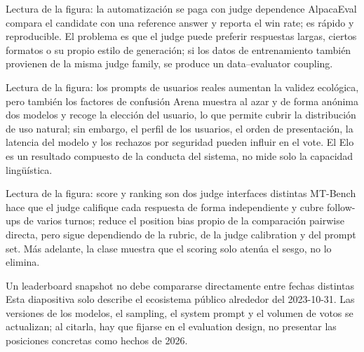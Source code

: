 
\begin{knowledgebox}{Lectura de la figura: la automatización se paga con judge dependence}
AlpacaEval compara el candidate con una reference answer y reporta el win rate; es rápido y reproducible. El problema es que el judge puede preferir respuestas largas, ciertos formatos o su propio estilo de generación; si los datos de entrenamiento también provienen de la misma judge family, se produce un data--evaluator coupling.
\end{knowledgebox}


\begin{knowledgebox}{Lectura de la figura: los prompts de usuarios reales aumentan la validez ecológica, pero también los factores de confusión}
Arena muestra al azar y de forma anónima dos modelos y recoge la elección del usuario, lo que permite cubrir la distribución de uso natural; sin embargo, el perfil de los usuarios, el orden de presentación, la latencia del modelo y los rechazos por seguridad pueden influir en el vote. El Elo es un resultado compuesto de la conducta del sistema, no mide solo la capacidad lingüística.
\end{knowledgebox}


\begin{knowledgebox}{Lectura de la figura: score y ranking son dos judge interfaces distintas}
MT-Bench hace que el judge califique cada respuesta de forma independiente y cubre follow-ups de varios turnos; reduce el position bias propio de la comparación pairwise directa, pero sigue dependiendo de la rubric, de la judge calibration y del prompt set. Más adelante, la clase muestra que el scoring solo atenúa el sesgo, no lo elimina.
\end{knowledgebox}


\begin{warningbox}{Un leaderboard snapshot no debe compararse directamente entre fechas distintas}
Esta diapositiva solo describe el ecosistema público alrededor del 2023-10-31. Las versiones de los modelos, el sampling, el system prompt y el volumen de votos se actualizan; al citarla, hay que fijarse en el evaluation design, no presentar las posiciones concretas como hechos de 2026.
\end{warningbox}


